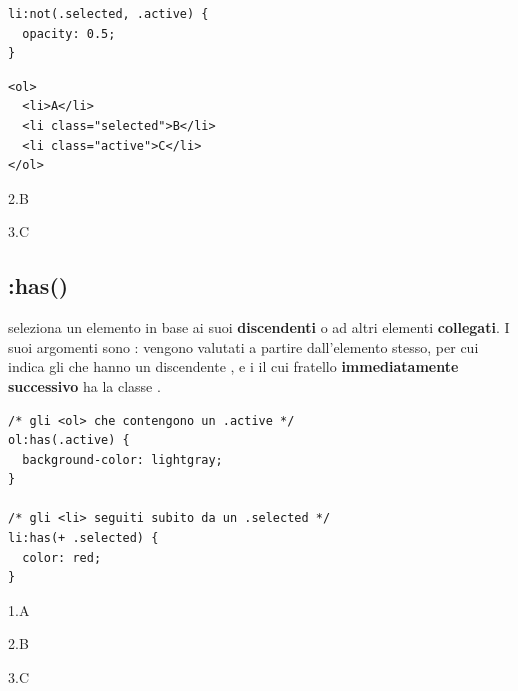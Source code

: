 \begin{affianco}[0.5][c]
\begin{lstlisting}[style=css, name=not.css]
li:not(.selected, .active) {
  opacity: 0.5;
}
\end{lstlisting}
\begin{lstlisting}[style=html, name=lista.html]
<ol>
  <li>A</li>
  <li class="selected">B</li>
  <li class="active">C</li>
</ol>
\end{lstlisting}
\risultato
\begin{browser}
  \par
  \hspace*{1.2em}2.\enspace B\par
  \hspace*{1.2em}3.\enspace C
\end{browser}
\end{affianco}

\subsection{:has()}

 seleziona un elemento in base ai suoi \textbf{discendenti} o ad
altri elementi \textbf{collegati}. I suoi argomenti sono : vengono valutati a partire dall'elemento stesso, per cui
 indica gli  che hanno un discendente
, e  i  il cui fratello
\textbf{immediatamente successivo} ha la classe .

\begin{affianco}[0.55][c]
\begin{lstlisting}[style=css, name=has.css]
/* gli <ol> che contengono un .active */
ol:has(.active) {
  background-color: lightgray;
}

/* gli <li> seguiti subito da un .selected */
li:has(+ .selected) {
  color: red;
}
\end{lstlisting}
\risultato
\begin{browser}
  \noindent\colorbox{css-lightgray}{\parbox{\dimexpr\linewidth-2\fboxsep}{%
    \hspace*{1.2em}\textcolor{css-red}{1.\enspace A}\par
    \hspace*{1.2em}2.\enspace B\par
    \hspace*{1.2em}3.\enspace C}}
\end{browser}
\end{affianco}

